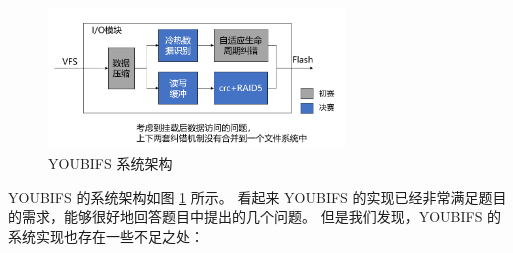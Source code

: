 \begin{figure}[htbp]
  \centering
  \includegraphics[width=0.7\textwidth]{fig/YOUBIFS项目框图}
  \caption{YOUBIFS 系统架构}
  \label{youbifs}
\end{figure}

YOUBIFS 的系统架构如图 \ref{youbifs} 所示。
看起来 YOUBIFS 的实现已经非常满足题目的需求，能够很好地回答题目中提出的几个问题。
但是我们发现，YOUBIFS 的系统实现也存在一些不足之处：

